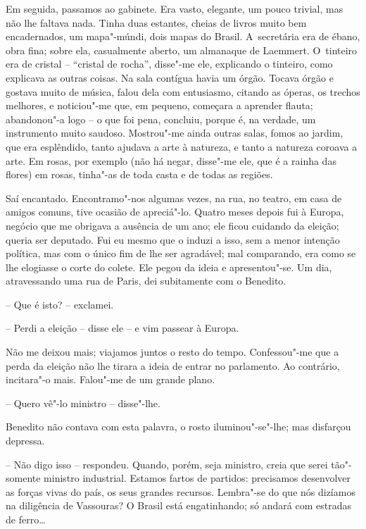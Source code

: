 Em seguida, passamos ao gabinete. Era vasto, elegante, um pouco trivial,
mas não lhe faltava nada. Tinha duas estantes, cheias de livros muito
bem encadernados, um mapa"-múndi, dois mapas do Brasil. A~secretária era
de ébano, obra fina; sobre ela, casualmente aberto, um almanaque de
Laemmert. O~tinteiro era de cristal -- ``cristal de rocha'', disse"-me
ele, explicando o tinteiro, como explicava as outras coisas. Na sala
contígua havia um órgão. Tocava órgão e gostava muito de música, falou
dela com entusiasmo, citando as óperas, os trechos melhores, e
noticiou"-me que, em pequeno, começara a aprender flauta; abandonou"-a
logo -- o que foi pena, concluiu, porque é, na verdade, um instrumento
muito saudoso. Mostrou"-me ainda outras salas, fomos ao jardim, que era
esplêndido, tanto ajudava a arte à natureza, e tanto a natureza coroava
a arte. Em rosas, por exemplo (não há negar, disse"-me ele, que é a
rainha das flores) em rosas, tinha"-as de toda casta e de todas as
regiões.

Saí encantado. Encontramo"-nos algumas vezes, na rua, no teatro, em casa
de amigos comuns, tive ocasião de apreciá"-lo. Quatro meses depois fui à
Europa, negócio que me obrigava a ausência de um ano; ele ficou cuidando
da eleição; queria ser deputado. Fui eu mesmo que o induzi a isso, sem a
menor intenção política, mas com o único fim de lhe ser agradável; mal
comparando, era como se lhe elogiasse o corte do colete. Ele pegou da
ideia e apresentou"-se. Um dia, atravessando uma rua de Paris, dei
subitamente com o Benedito.

-- Que é isto? -- exclamei.

-- Perdi a eleição -- disse ele -- e vim passear à Europa.

Não me deixou mais; viajamos juntos o resto do tempo. Confessou"-me que a
perda da eleição não lhe tirara a ideia de entrar no parlamento. Ao
contrário, incitara"-o mais. Falou"-me de um grande plano.

-- Quero vê"-lo ministro -- disse"-lhe.

Benedito não contava com esta palavra, o rosto iluminou"-se"-lhe; mas
disfarçou depressa.

-- Não digo isso -- respondeu. Quando, porém, seja ministro, creia que
serei tão"-somente ministro industrial. Estamos fartos de partidos:
precisamos desenvolver as forças vivas do país, os seus grandes
recursos. Lembra"-se do que nós dizíamos na diligência de Vassouras? O
Brasil está engatinhando; só andará com estradas de ferro\ldots{}


